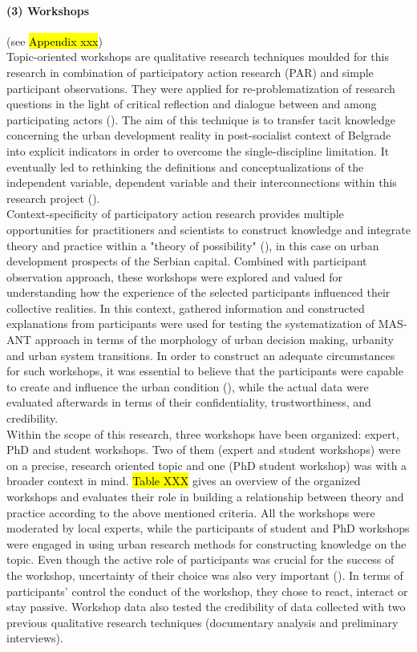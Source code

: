 \documentclass[11pt]{report}
\begin{document}
\paragraph{(3) Workshops} 
(see \hl{Appendix xxx})
\\
Topic-oriented workshops are qualitative research techniques moulded for this research in combination of participatory action research (PAR) and simple participant observations. They were applied for re-problematization of research questions in the light of critical reflection and dialogue between and among participating actors (\cite{ref mcintyre PAR}). The aim of this technique is to transfer tacit knowledge concerning the urban development reality in post-socialist context of Belgrade into explicit indicators in order to overcome the single-discipline limitation. It eventually led to rethinking the definitions and conceptualizations of the independent variable, dependent variable and their interconnections within this research project (\cite{ref whyte PAR ref}). 
\\
Context-specificity of participatory action research provides multiple opportunities for practitioners and scientists to construct knowledge and integrate theory and practice within a "theory of possibility" (\cite{ref mcintyre PAR}), in this case on urban development prospects of the Serbian capital. Combined with participant observation approach, these workshops were explored and valued for understanding how the experience of the selected participants influenced their collective  realities. In this context, gathered information and constructed explanations from participants were used for testing the systematization of MAS-ANT approach in terms of the morphology of urban decision making, urbanity and urban system transitions. In order to construct an adequate circumstances for such workshops, it was essential to believe that the participants were capable to create and influence the urban condition (\cite{ref mcintyre PAR}), while the actual data were evaluated afterwards in terms of their confidentiality, trustworthiness, and credibility.
\\
Within the scope of this research, three workshops have been organized: expert, PhD and student workshops. Two of them (expert and student workshops) were on a precise, research oriented topic and one (PhD student workshop) was with a broader context in mind. \hl{Table XXX} gives an overview of the organized workshops and evaluates their role in building a relationship between theory and practice according to the above mentioned criteria. All the workshops were moderated by local experts, while the participants of student and PhD workshops were engaged in using urban research methods for  constructing  knowledge on the topic. Even though the active role of participants was crucial for the success of the workshop, uncertainty of their choice was also very important (\cite{ref mcintyre PAR}). In terms of participants' control the conduct of the workshop, they chose to react, interact or stay passive. Workshop data also tested the credibility of data collected with two previous qualitative research techniques (documentary analysis and preliminary interviews).
\end{document}
